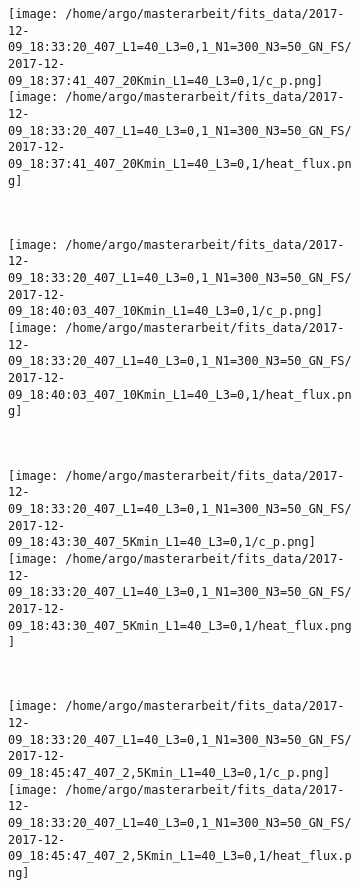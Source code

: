 \documentclass{scrartcl}[12pt, halfparskip]
\numberwithin{equation}{section}
\numberwithin{figure}{section}
\numberwithin{table}{section}
\begin{document}
\begin{figure}[H]
	\begin{subfigure}{1.\textwidth}
		\texttt{[image: /home/argo/masterarbeit/fits\_data/2017-12-09\_18:33:20\_407\_L1=40\_L3=0,1\_N1=300\_N3=50\_GN\_FS/2017-12-09\_18:37:41\_407\_20Kmin\_L1=40\_L3=0,1/c\_p.png]}
		\texttt{[image: /home/argo/masterarbeit/fits\_data/2017-12-09\_18:33:20\_407\_L1=40\_L3=0,1\_N1=300\_N3=50\_GN\_FS/2017-12-09\_18:37:41\_407\_20Kmin\_L1=40\_L3=0,1/heat\_flux.png]}
	\end{subfigure} \\[1ex]
	
	\begin{subfigure}{1.\textwidth}
		\texttt{[image: /home/argo/masterarbeit/fits\_data/2017-12-09\_18:33:20\_407\_L1=40\_L3=0,1\_N1=300\_N3=50\_GN\_FS/2017-12-09\_18:40:03\_407\_10Kmin\_L1=40\_L3=0,1/c\_p.png]}
		\texttt{[image: /home/argo/masterarbeit/fits\_data/2017-12-09\_18:33:20\_407\_L1=40\_L3=0,1\_N1=300\_N3=50\_GN\_FS/2017-12-09\_18:40:03\_407\_10Kmin\_L1=40\_L3=0,1/heat\_flux.png]}
	\end{subfigure} \\[1ex]
	
	\begin{subfigure}{1.\textwidth}
		\texttt{[image: /home/argo/masterarbeit/fits\_data/2017-12-09\_18:33:20\_407\_L1=40\_L3=0,1\_N1=300\_N3=50\_GN\_FS/2017-12-09\_18:43:30\_407\_5Kmin\_L1=40\_L3=0,1/c\_p.png]}
		\texttt{[image: /home/argo/masterarbeit/fits\_data/2017-12-09\_18:33:20\_407\_L1=40\_L3=0,1\_N1=300\_N3=50\_GN\_FS/2017-12-09\_18:43:30\_407\_5Kmin\_L1=40\_L3=0,1/heat\_flux.png]}
	\end{subfigure} \\[1ex]
	
	\begin{subfigure}{1.\textwidth}
		\texttt{[image: /home/argo/masterarbeit/fits\_data/2017-12-09\_18:33:20\_407\_L1=40\_L3=0,1\_N1=300\_N3=50\_GN\_FS/2017-12-09\_18:45:47\_407\_2,5Kmin\_L1=40\_L3=0,1/c\_p.png]}
		\texttt{[image: /home/argo/masterarbeit/fits\_data/2017-12-09\_18:33:20\_407\_L1=40\_L3=0,1\_N1=300\_N3=50\_GN\_FS/2017-12-09\_18:45:47\_407\_2,5Kmin\_L1=40\_L3=0,1/heat\_flux.png]}
	\end{subfigure}
	\caption{}
	\label{fig:optim_c_p_heat_flux_FS_1}
\end{figure}
\end{document}
